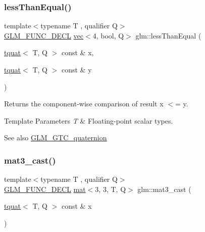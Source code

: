 \subsubsection{\texorpdfstring{less\+Than\+Equal()}{lessThanEqual()}}
{\footnotesize\ttfamily template$<$typename T , qualifier Q$>$ \\
\hyperlink{setup_8hpp_ab2d052de21a70539923e9bcbf6e83a51}{G\+L\+M\+\_\+\+F\+U\+N\+C\+\_\+\+D\+E\+CL} \hyperlink{structglm_1_1vec}{vec}$<$4, bool, Q$>$ glm\+::less\+Than\+Equal (\begin{DoxyParamCaption}\item[{\hyperlink{structglm_1_1tquat}{tquat}$<$ T, Q $>$ const \&}]{x,  }\item[{\hyperlink{structglm_1_1tquat}{tquat}$<$ T, Q $>$ const \&}]{y }\end{DoxyParamCaption})}

Returns the component-\/wise comparison of result x $<$= y.


\begin{DoxyTemplParams}{Template Parameters}
{\em T} & Floating-\/point scalar types.\\
\hline
\end{DoxyTemplParams}
\begin{DoxySeeAlso}{See also}
\hyperlink{group__gtc__quaternion}{G\+L\+M\+\_\+\+G\+T\+C\+\_\+quaternion} 
\end{DoxySeeAlso}
\mbox{\label{group__gtc__quaternion_ga6e88f15c94effe737c876d21ea0db101}} 
\subsubsection{\texorpdfstring{mat3\+\_\+cast()}{mat3\_cast()}}
{\footnotesize\ttfamily template$<$typename T , qualifier Q$>$ \\
\hyperlink{setup_8hpp_ab2d052de21a70539923e9bcbf6e83a51}{G\+L\+M\+\_\+\+F\+U\+N\+C\+\_\+\+D\+E\+CL} \hyperlink{structglm_1_1mat}{mat}$<$3, 3, T, Q$>$ glm\+::mat3\+\_\+cast (\begin{DoxyParamCaption}\item[{\hyperlink{structglm_1_1tquat}{tquat}$<$ T, Q $>$ const \&}]{x }\end{DoxyParamCaption})}

